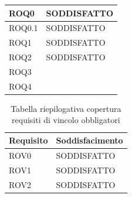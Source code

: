 \documentclass[openany,12pt,a4paper]{report}
\begin{document}
\begin{itemize}
\begin{longtable}{|p{60mm}|p{60mm}|}
	\hline \centering ROQ0 & SODDISFATTO \\
	\hline \centering ROQ0.1 & SODDISFATTO\\
	\hline \centering ROQ1 & SODDISFATTO\\
	\hline \centering ROQ2 & SODDISFATTO\\
	\hline \centering ROQ3 & \\
	\hline \centering ROQ4 & \\
	\hline
	
	\end{longtable}


	\begin{longtable}{|p{60mm}|p{60mm}|}
	\caption{Tabella riepilogativa copertura requisiti di vincolo obbligatori} \\
	\hline
	\centering \textbf{Requisito} &  \textbf{Soddisfacimento}\\
	
	\hline \centering ROV0 & SODDISFATTO \\
	\hline \centering ROV1 & SODDISFATTO\\
	\hline \centering ROV2 & SODDISFATTO\\
	\hline
	
	\end{longtable}


\end{itemize}
\end{document}
